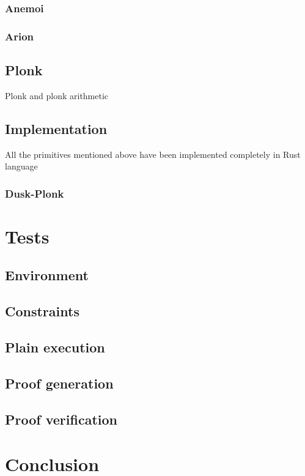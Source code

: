 \documentclass[12pt, a4paper]{report}
\begin{document}
\subsection{Anemoi}\label{subsec:anemoi}

\subsection{Arion}\label{subsec:arion}

\section{Plonk}

Plonk and plonk arithmetic

\section{Implementation}\label{sec:implementation}

All the primitives mentioned above have been implemented completely in Rust language

\subsection{Dusk-Plonk}\label{subsec:duskplonk}

\chapter{Tests}\label{chap:tests}

\section{Environment}\label{sec:environment}

\section{Constraints}\label{sec:constraints}

\section{Plain execution}\label{sec:plain}

\section{Proof generation}\label{sec:proofgen}

\section{Proof verification}\label{sec:proofver}

\chapter{Conclusion}\label{chap:conclusion}
\end{document}
